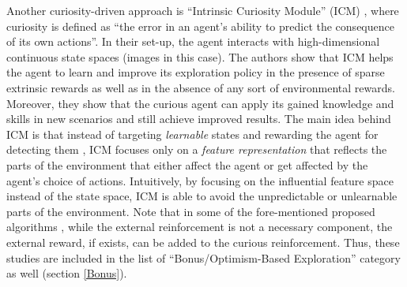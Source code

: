 Another curiosity-driven approach is ``Intrinsic Curiosity Module'' (ICM) , where curiosity is defined as ``the error in an agent's ability to predict the consequence of its own actions''. In their set-up, the agent interacts with high-dimensional continuous state spaces (images in this case). The authors show that ICM helps the agent to learn and improve its exploration policy in the presence of sparse extrinsic rewards as well as in the absence of any sort of environmental rewards. Moreover, they show that the curious agent can apply its gained knowledge and skills in new scenarios and still achieve improved results. The main idea behind ICM is that instead of targeting \emph{learnable} states and rewarding the agent for detecting them , ICM  focuses only on a \emph{feature representation} that reflects the parts of the environment that either affect the agent or get affected by the agent's choice of actions. Intuitively, by focusing on the influential feature space instead of the state space, ICM is able to avoid the unpredictable or unlearnable parts of the environment. 
Note that in some of the fore-mentioned proposed algorithms , while the external reinforcement is not a necessary component, the external reward, if exists, can be added to the curious reinforcement. Thus, these studies are included in the list of ``Bonus/Optimism-Based Exploration'' category as well (section \ref{Bonus}). 

